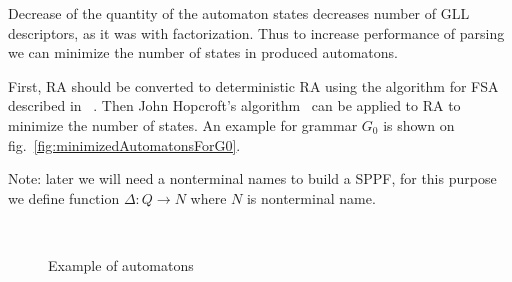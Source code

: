 \documentclass[runningheads,a4paper]{llncs}
\begin{document}
Decrease of the quantity of the automaton states decreases number of GLL descriptors, as it was with factorization.
Thus to increase performance of parsing we can minimize the number of states in produced automatons.

First, RA should be converted to deterministic RA using the algorithm for FSA described in ~\cite{aho1974design}.
Then John Hopcroft's algorithm~\cite{hopcroft1971n} can be applied to RA to minimize the number of states.
An example for grammar $G_0$ is shown on fig.~\ref{fig:minimizedAutomatonsForG0}.

Note: later we will need a nonterminal names to build a SPPF, for this purpose we define function $\Delta : Q \to N$ where $N$
is nonterminal name.

\begin{figure}
    \centering
    ~
    ~
    \caption{Example of automatons}
    \label{fig:fig1}
\end{figure}
\end{document}
